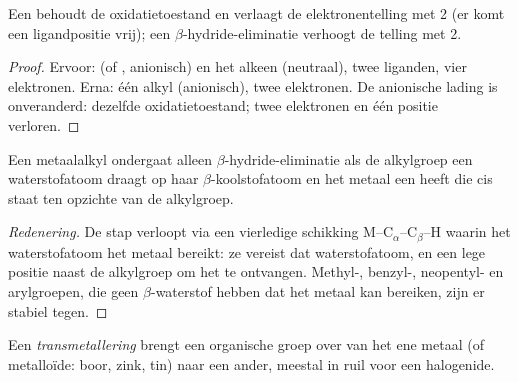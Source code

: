 \begin{proposition}\label{prop:b2:catalytic-cycles:insertion}
Een  behoudt de oxidatietoestand en verlaagt de elektronentelling met 2
(er komt een ligandpositie vrij); een $\beta$-hydride-eliminatie verhoogt de telling met 2.
\end{proposition}

\begin{proof}
Ervoor:  (of , anionisch) en het alkeen (neutraal), twee liganden, vier elektronen.
Erna: één alkyl (anionisch), twee elektronen. De anionische lading is onveranderd: dezelfde
oxidatietoestand; twee elektronen en één positie verloren.
\end{proof}

\begin{proposition}\label{prop:b2:catalytic-cycles:beta-h}
Een metaalalkyl ondergaat alleen $\beta$-hydride-eliminatie als de alkylgroep een waterstofatoom draagt op
haar $\beta$-koolstofatoom en het metaal een  heeft die cis staat ten opzichte van de alkylgroep.
\end{proposition}

\begin{proof}[Redenering]
De stap verloopt via een vierledige schikking M--C$_\alpha$--C$_\beta$--H waarin het
waterstofatoom het metaal bereikt: ze vereist dat waterstofatoom, en een lege positie naast de alkylgroep
om het te ontvangen. Methyl-, benzyl-, neopentyl- en arylgroepen, die geen $\beta$-waterstof
hebben dat het metaal kan bereiken, zijn er stabiel tegen.
\end{proof}

\begin{definition}[Transmetallering]\label{def:b2:catalytic-cycles:transmetalation}
Een \emph{transmetallering} brengt een organische groep over van het ene metaal
(of metalloïde: boor, zink, tin) naar een ander, meestal in ruil voor een halogenide.
\end{definition}

